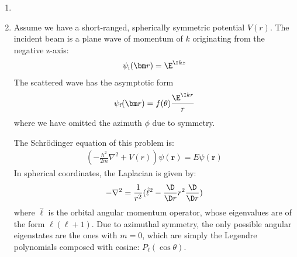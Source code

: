 \documentclass[fleqn, 12pt]{article}
\begin{document}
\begin{enumerate}

\item %

\item Assume we have a short-ranged, spherically symmetric potential $V(r)$.
  The incident beam is a plane wave of momentum of $k$ originating from the
  negative z-axis:
  \begin{align*}
    \psi_{\text i}(\bm r) = \E^{\I k z}
  \end{align*}
  The scattered wave has the asymptotic form
  \begin{align*}
    \psi_{\text f}(\bm r) = f(\theta) \frac{\E^{\I k r}}{r}
  \end{align*}
  where we have omitted the azimuth $\phi$ due to symmetry.

  The Schr\"odinger equation of this problem is:
  \begin{align*}
    \left(-\frac{\hbar^2}{2 m} \nabla^2 + V(r)\right) \psi(\bm r)
    = E \psi(\bm r)
  \end{align*}
  In spherical coordinates, the Laplacian is given by:
  \begin{align*}
  -\nabla^2 = \frac{1}{r^2} (\hat \ell^2 - \frac{\D}{\D r} r^2 \frac{\D}{\D r})
  \end{align*}
  where $\hat{\bm \ell}$ is the orbital angular momentum operator, whose
  eigenvalues are of the form $\ell (\ell + 1)$.  Due to azimuthal symmetry,
  the only possible angular eigenstates are the ones with $m = 0$, which are
  simply the Legendre polynomials composed with cosine: $P_\ell(\cos \theta)$.


\end{enumerate}
\end{document}
